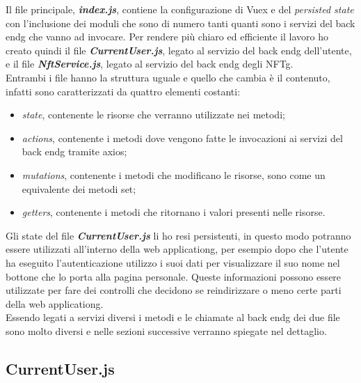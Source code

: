 Il file principale, \textbf{\textit{index.js}}, contiene la configurazione di Vuex e del \textit{persisted state} con l'inclusione dei moduli che sono di numero tanti quanti sono i servizi del \gls{back endg} che vanno ad invocare. Per rendere più chiaro ed efficiente il lavoro ho creato quindi il file \textbf{\textit{CurrentUser.js}}, legato al servizio del \gls{back endg} dell'utente, e il file \textbf{\textit{NftService.js}}, legato al servizio del \gls{back endg} degli \gls{NFTg}.\\
Entrambi i file hanno la struttura uguale e quello che cambia è il contenuto, infatti sono caratterizzati da quattro elementi costanti:
\begin{itemize}
	\item \textit{state}, contenente le risorse che verranno utilizzate nei metodi;
	\item \textit{actions}, contenente i metodi dove vengono fatte le invocazioni ai servizi del \gls{back endg} tramite axios;
	\item \textit{mutations}, contenente i metodi che modificano le risorse, sono come un equivalente dei metodi set;
	\item \textit{getters}, contenente i metodi che ritornano i valori presenti nelle risorse.
\end{itemize}

Gli state del file \textbf{\textit{CurrentUser.js}} li ho resi persistenti, in questo modo potranno essere utilizzati all'interno della \gls{web applicationg}, per esempio dopo che l'utente ha eseguito l'autenticazione utilizzo i suoi dati per visualizzare il suo nome nel bottone che lo porta alla pagina personale. Queste informazioni possono essere utilizzate per fare dei controlli che decidono se reindirizzare o meno certe parti della \gls{web applicationg}.\\
Essendo legati a servizi diversi i metodi e le chiamate al \gls{back endg} dei due file sono molto diversi e nelle sezioni successive verranno spiegate nel dettaglio.

\subsection{CurrentUser.js}
\label{subsec:currentuser}

